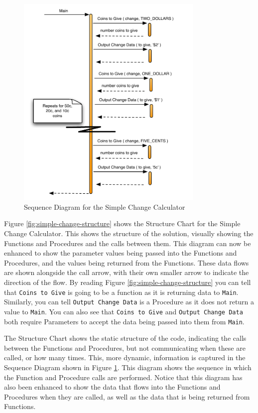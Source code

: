 \begin{figure}[p]
   \centering
   \includegraphics[width=0.8\textwidth]{./topics/storing-using-data/images/SimpleCalcSeq} 
   \caption{Sequence Diagram for the Simple Change Calculator}
   \label{fig:simple-change-seq}
\end{figure}

Figure \ref{fig:simple-change-structure} shows the Structure Chart for the Simple Change Calculator. This shows the structure of the solution, visually showing the Functions and Procedures and the calls between them. This diagram can now be enhanced to show the parameter values being passed into the Functions and Procedures, and the values being returned from the Functions. These data flows are shown alongside the call arrow, with their own smaller arrow to indicate the direction of the flow. By reading Figure \ref{fig:simple-change-structure} you can tell that \texttt{Coins to Give} is going to be a function as it is returning data to \texttt{Main}. Similarly, you can tell \texttt{Output Change Data} is a Procedure as it does not return a value to \texttt{Main}. You can also see that \texttt{Coins to Give} and \texttt{Output Change Data} both require Parameters to accept the data being passed into them from \texttt{Main}. 

The Structure Chart shows the static structure of the code, indicating the calls between the Functions and Procedures, but not communicating when these are called, or how many times. This, more dynamic, information is captured in the Sequence Diagram shown in Figure \ref{fig:simple-change-seq}. This diagram shows the sequence in which the Function and Procedure calls are performed. Notice that this diagram has also been enhanced to show the data that flows into the Functions and Procedures when they are called, as well as the data that is being returned from Functions.

